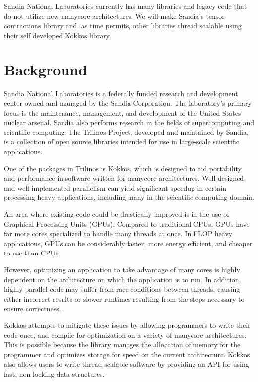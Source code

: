 \documentclass[proposal]{hmcclinic}
\begin{document}
Sandia National Laboratories currently has many libraries and legacy code that
do not utilize new manycore architectures. We will make Sandia's tensor contractions
library and, as time permits, other libraries thread scalable using their self
developed Kokkos library.


\section{Background}

Sandia National Laboratories is a federally funded research and development
center owned and managed by the Sandia Corporation.  The laboratory's primary
focus is the maintenance, management, and development of the United States'
nuclear arsenal.  Sandia also performs research in the fields of supercomputing
and scientific computing.  The Trilinos Project, developed and maintained by
Sandia, is a collection of open source libraries intended for use in large-scale
scientific applications.

One of the packages in Trilinos is Kokkos, which is designed to aid portability
and performance in software written for manycore architectures.  Well designed
and well implemented parallelism can yield significant speedup in certain
processing-heavy applications, including many in the scientific computing
domain.

An area where existing code could be drastically improved is in the use of
Graphical Processing Units (GPUs).  Compared to traditional CPUs, GPUs have far
more cores specialized to handle many threads at once.  In FLOP heavy
applications, GPUs can be considerably faster, more energy efficient, and
cheaper to use than CPUs.

However, optimizing an application to take advantage of many cores is highly
dependent on the architecture on which the application is to run.  In addition,
highly parallel code may suffer from race conditions between threads, causing
either incorrect results or slower runtimes resulting from the steps necessary
to ensure correctness.

Kokkos attempts to mitigate these issues by allowing programmers to
write their code once, and compile for optimization on a variety of
manycore architectures.  This is possible because the library manages the
allocation of memory for the programmer and optimizes storage for speed on
the current architecture. Kokkos also allows users to write thread scalable
software by providing an API for using fast, non-locking data structures.
\end{document}
